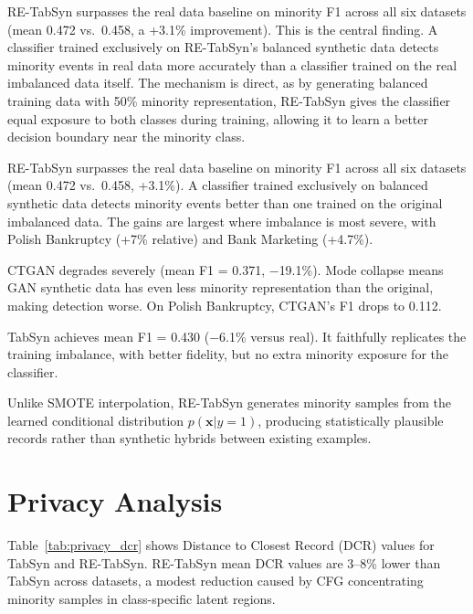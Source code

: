 RE-TabSyn surpasses the real data baseline on minority F1 across all six datasets (mean 0.472 vs.\ 0.458, a +3.1\% improvement). This is the central finding. A classifier trained exclusively on RE-TabSyn's balanced synthetic data detects minority events in real data more accurately than a classifier trained on the real imbalanced data itself. The mechanism is direct, as by generating balanced training data with 50\% minority representation, RE-TabSyn gives the classifier equal exposure to both classes during training, allowing it to learn a better decision boundary near the minority class.

RE-TabSyn surpasses the real data baseline on minority F1 across all six datasets (mean 0.472 vs.\ 0.458, +3.1\%). A classifier trained exclusively on balanced synthetic data detects minority events better than one trained on the original imbalanced data. The gains are largest where imbalance is most severe, with Polish Bankruptcy (+7\% relative) and Bank Marketing (+4.7\%).

CTGAN degrades severely (mean F1 = 0.371, $-$19.1\%). Mode collapse means GAN synthetic data has even less minority representation than the original, making detection worse. On Polish Bankruptcy, CTGAN's F1 drops to 0.112.

TabSyn achieves mean F1 = 0.430 ($-$6.1\% versus real). It faithfully replicates the training imbalance, with better fidelity, but no extra minority exposure for the classifier.

Unlike SMOTE interpolation, RE-TabSyn generates minority samples from the learned conditional distribution $p(\mathbf{x} | y=1)$, producing statistically plausible records rather than synthetic hybrids between existing examples.

\section{Privacy Analysis}

Table~\ref{tab:privacy_dcr} shows Distance to Closest Record (DCR) values for TabSyn and RE-TabSyn. RE-TabSyn mean DCR values are 3--8\% lower than TabSyn across datasets, a modest reduction caused by CFG concentrating minority samples in class-specific latent regions.

\renewcommand{\arraystretch}{1.2}

